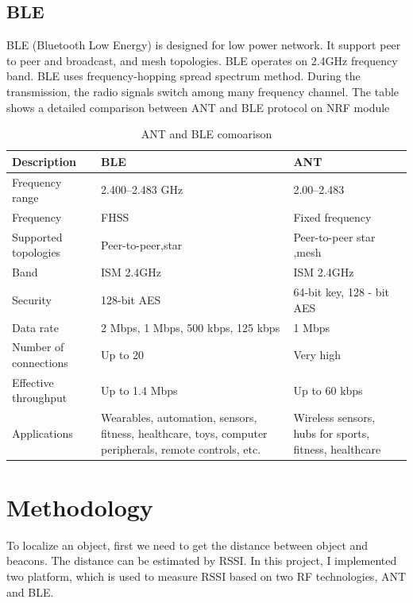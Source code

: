 \documentclass{article}
\begin{document}
\subsection{BLE}

BLE (Bluetooth Low Energy) is designed for low power network. It support peer to peer and broadcast, and mesh topologies. BLE operates on 2.4GHz frequency band. BLE uses frequency-hopping spread spectrum method. During the transmission, the radio signals switch among many frequency channel. The table shows a detailed comparison between ANT and BLE protocol on NRF module

\begin{table}[!h]
\begin{center}
\caption{ANT and BLE comoarison}
\label{ANT and BLE comoarison}
\begin{tabular}{|l|p{5cm}|p{5cm}|}
\hline
Description & BLE  &  ANT \\
\hline
Frequency range & 2.400--2.483 GHz &  2.00--2.483  \\
\hline
Frequency & FHSS &  Fixed frequency  \\
\hline
Supported topologies & Peer-to-peer,star & Peer-to-peer star ,mesh \\
\hline
Band & ISM 2.4GHz & ISM 2.4GHz \\
\hline
Security & 128-bit AES  & 64-bit key, 128 - bit AES \\
\hline 
Data rate &	2 Mbps, 1 Mbps, 500 kbps, 125 kbps	 & 1 Mbps \\
\hline
Number of connections	 & Up to 20	& Very high \\
\hline
Effective throughput	 & Up to 1.4 Mbps	& Up to 60 kbps \\
\hline
Applications	& Wearables, automation, sensors, fitness, healthcare, toys, computer peripherals, remote controls, etc.	 & Wireless sensors, hubs for sports, fitness, healthcare \\
\hline
\end{tabular}
\end{center}
\end{table}


\section{Methodology}

To localize an object,  first we need to get the distance between object and beacons. The distance can be estimated by RSSI. In this project, I implemented two platform, which is used to measure RSSI based on two RF technologies, ANT and BLE.
\end{document}
